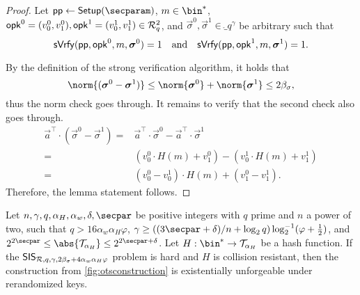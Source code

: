 \begin{proof}
  Let $\params\gets\setup(\secparam)$, $m\in\bin^*$, $\mathsf{opk}^0=(v^0_0,v^0_1),\mathsf{opk}^1=(v^1_0,v^1_1)\in \mathcal{R}^2_q$, and $\vec{\sigma}^0,\vec{\sigma}^1 \in \ring_q^\gamma$ be arbitrary such that \[\mathsf{sVrfy}(\mathsf{pp},\mathsf{opk}^0,m,\boldsymbol{\sigma}^0)=1 \quad\text{and}\quad \mathsf{sVrfy}(\mathsf{pp},\mathsf{opk}^1,m,\boldsymbol{\sigma}^1)=1.\]
  
  By the definition of the strong verification algorithm, it holds that
  \begin{equation*}
     \norm{(\vec{\sigma}^0-\vec{\sigma}^1)}
    \leq \norm{\vec{\sigma}^0}+\norm{\vec{\sigma}^1}
    \leq 2\beta_\sigma,
  \end{equation*}
  thus the norm check goes through.
  It remains to verify that the second check also goes through.
  \begin{align*}
     \vec{a}^\intercal\cdot (\vec{\sigma}^0-\vec{\sigma}^1)
    ={}& \vec{a}^\intercal\cdot \vec{\sigma}^0- \vec{a}^\intercal\cdot\vec{\sigma}^1\\
    ={}& (v^0_0\cdot H(m) + v^0_1) - (v^1_0\cdot H(m) + v^1_1)\tag{Def of $\sverify$}\\
    ={}& (v^0_0-v^1_0)\cdot H(m) + (v^0_1-v^1_1).
  \end{align*}
  Therefore, the lemma statement follows.
\end{proof}


\begin{lemma}\label{lem:kots_sis}
  Let $n,\gamma,q,\alpha_H,\alpha_w,\delta,\secpar$ be positive integers with $q$ prime and $n$ a power of two, such that $q > 16 \alpha_w \alpha_H\varphi$, $\gamma\geq((3\secpar+\delta)/n+\log_2q)\log^{-1}_2(\varphi+\tfrac{1}{2})$, and $2^{2\secpar} \leq \abs{\tern_{\alpha_H}} \leq 2^{2\secpar + \delta}$.
  Let $H : \bin^* \to \tern_{\alpha_H}$ be a hash function.
  If the $\mathsf{SIS}_{\mathcal{R},q,\gamma,2\beta_\sigma + 4\alpha_w\alpha_H\varphi}$ problem is hard and $H$ is collision resistant, then the construction from \autoref{fig:otsconstruction} is existentially unforgeable under rerandomized keys.
\end{lemma}

